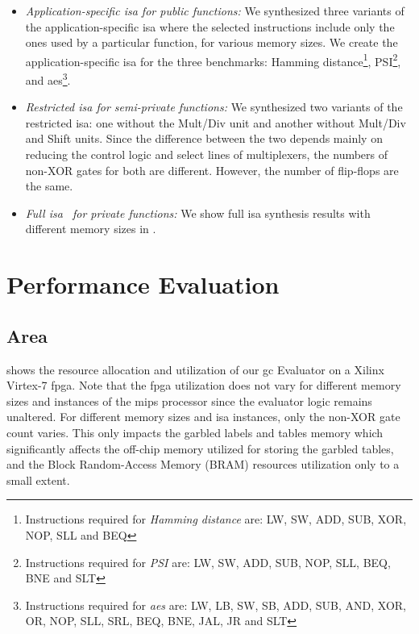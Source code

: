 \begin{itemize}
\item \emph{Application-specific \acrshort{isa} for public functions:} We synthesized three variants of the application-specific \acrshort{isa} where the selected instructions include only the ones used by a particular function, for various memory sizes. We create the application-specific \acrshort{isa} for the three benchmarks: Hamming distance\footnote{\small{Instructions required for \emph{Hamming distance} are:} \tiny{LW, SW, ADD, SUB, XOR, NOP, SLL and BEQ}}, PSI\footnote{\small{Instructions required for \emph{PSI} are:} \tiny{LW, SW, ADD, SUB, NOP, SLL, BEQ, BNE and SLT}}, and \acrshort{aes}\footnote{ \small{Instructions required for \emph{\acrshort{aes}} are:} \tiny{LW, LB, SW, SB, ADD, SUB, AND, XOR, OR, NOP, SLL, SRL, BEQ, BNE, JAL, JR and SLT}}.
\item \emph{Restricted \acrshort{isa} for semi-private functions:} We synthesized two variants of the restricted \acrshort{isa}: one without the Mult/Div unit and another without Mult/Div and Shift units. Since the difference between the two depends mainly on reducing the control logic and select lines of multiplexers, the numbers of non-XOR gates for both are different. However, the number of flip-flops are the same.
\item \emph{Full \acrshort{isa}~\cite{songhori2015tinygarble} for private functions:} We show full \acrshort{isa} synthesis results with different memory sizes in .
\end{itemize}

\section{Performance Evaluation}
\subsection{Area}  shows the resource allocation and utilization of our \acrshort{gc} Evaluator on a Xilinx Virtex-7 \acrshort{fpga}. Note that the \acrshort{fpga} utilization does not vary for different memory sizes and instances of the \gls{mips} processor since the evaluator logic remains unaltered. For different memory sizes and \acrshort{isa} instances, only the non-XOR gate count varies. This only impacts the garbled labels and tables memory which significantly affects the off-chip memory utilized for storing the garbled tables, and the Block Random-Access Memory (BRAM) resources utilization only to a small extent.

